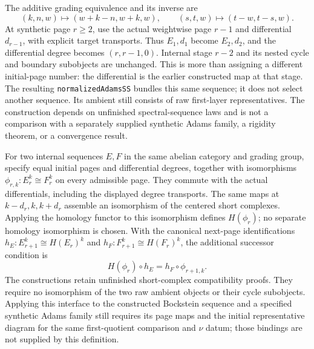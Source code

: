 \begin{definition}
  \label{def:lambda-normalized-sequence}
  \notready
  The additive grading equivalence and its inverse are
  \[
    (k,n,w)\longmapsto(w+k-n,w+k,w),\qquad
    (s,t,w)\longmapsto(t-w,t-s,w).
  \]
  At synthetic page $r\ge2$, use the actual weightwise page $r-1$ and
  differential $d_{r-1}$, with explicit target transports. Thus
  $E_1,d_1$ become $E_2,d_2$, and the differential degree becomes
  $(r,r-1,0)$. Internal stage $r-2$ and its nested cycle and boundary
  subobjects are unchanged. This is more than assigning a different
  initial-page number: the differential is the earlier constructed map
  at that stage.
  The resulting \texttt{normalizedAdamsSS} bundles this same sequence;
  it does not select another sequence. Its ambient still consists of raw
  first-layer representatives. The construction depends on unfinished
  spectral-sequence laws and is not a comparison with a separately supplied
  synthetic Adams family, a rigidity theorem, or a convergence result.
\end{definition}

\begin{definition}
  \label{def:pagewise-sequence-comparison}
  \notready
  For two internal sequences $E,F$ in the same abelian category and grading
  group, specify equal initial pages and differential degrees, together with
  isomorphisms $\phi_{r,k}:E_r^k\cong F_r^k$ on every admissible page.
  They commute with the actual differentials, including the displayed
  degree transports. The same maps at $k-d_r,k,k+d_r$ assemble an
  isomorphism of the centered short complexes. Applying the homology
  functor to this isomorphism defines $H(\phi_r)$; no separate homology
  isomorphism is chosen.
  With the canonical next-page identifications
  $h_E:E_{r+1}^k\cong H(E_r)^k$ and
  $h_F:F_{r+1}^k\cong H(F_r)^k$, the additional successor condition is
  \[
    H(\phi_r)\circ h_E=h_F\circ\phi_{r+1,k}.
  \]
  The constructions retain unfinished short-complex compatibility proofs.
  They require no isomorphism of the two raw ambient objects or their cycle
  subobjects. Applying this interface to the constructed Bockstein sequence
  and a specified synthetic Adams family still requires its page maps and
  the initial representative diagram for the same first-quotient comparison
  and $\nu$ datum; those bindings are not supplied by this definition.
\end{definition}

